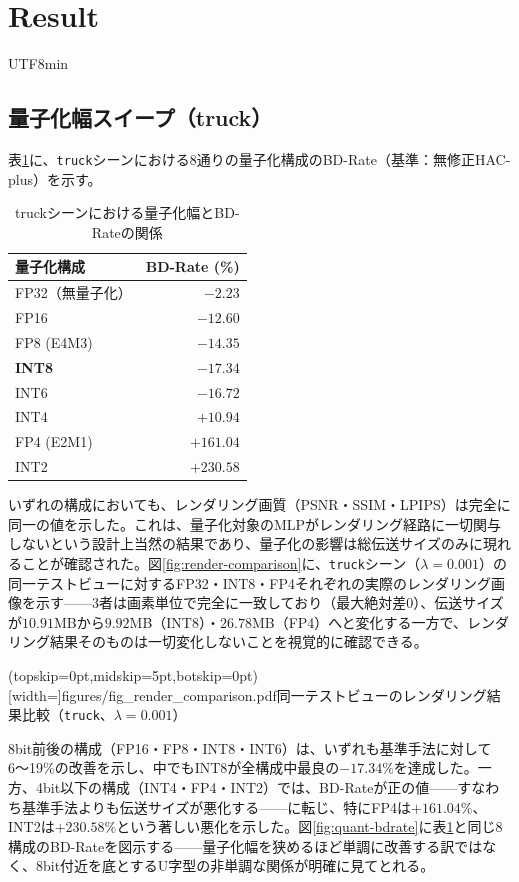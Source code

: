 \documentclass{ieeeaccess}
\begin{document}
\section{Result}
\begin{CJK}{UTF8}{min}

\subsection{量子化幅スイープ（truck）}
表\ref{tab:quant-sweep}に、\texttt{truck}シーンにおける8通りの量子化構成のBD-Rate（基準：無修正HAC-plus）を示す。

\begin{table}[!t]
\renewcommand{\arraystretch}{1.2}
\caption{truckシーンにおける量子化幅とBD-Rateの関係}
\label{tab:quant-sweep}
\centering
\begin{tabular}{lr}
\toprule
量子化構成 & BD-Rate (\%) \\
\midrule
FP32（無量子化） & $-2.23$ \\
FP16 & $-12.60$ \\
FP8 (E4M3) & $-14.35$ \\
\textbf{INT8} & $\mathbf{-17.34}$ \\
INT6 & $-16.72$ \\
INT4 & $+10.94$ \\
FP4 (E2M1) & $+161.04$ \\
INT2 & $+230.58$ \\
\bottomrule
\end{tabular}
\end{table}

いずれの構成においても、レンダリング画質（PSNR・SSIM・LPIPS）は完全に同一の値を示した。これは、量子化対象のMLPがレンダリング経路に一切関与しないという設計上当然の結果であり、量子化の影響は総伝送サイズのみに現れることが確認された。図\ref{fig:render-comparison}に、\texttt{truck}シーン（$\lambda=0.001$）の同一テストビューに対するFP32・INT8・FP4それぞれの実際のレンダリング画像を示す——3者は画素単位で完全に一致しており（最大絶対差$0$）、伝送サイズが$10.91$MBから$9.92$MB（INT8）・$26.78$MB（FP4）へと変化する一方で、レンダリング結果そのものは一切変化しないことを視覚的に確認できる。

\Figure[t!](topskip=0pt,midskip=5pt,botskip=0pt)[width=\columnwidth]{figures/fig_render_comparison.pdf}{同一テストビューのレンダリング結果比較（\texttt{truck}、$\lambda=0.001$）\label{fig:render-comparison}}

8bit前後の構成（FP16・FP8・INT8・INT6）は、いずれも基準手法に対して6〜19\%の改善を示し、中でもINT8が全構成中最良の$-17.34\%$を達成した。一方、4bit以下の構成（INT4・FP4・INT2）では、BD-Rateが正の値——すなわち基準手法よりも伝送サイズが悪化する——に転じ、特にFP4は$+161.04\%$、INT2は$+230.58\%$という著しい悪化を示した。図\ref{fig:quant-bdrate}に表\ref{tab:quant-sweep}と同じ8構成のBD-Rateを図示する——量子化幅を狭めるほど単調に改善する訳ではなく、8bit付近を底とするU字型の非単調な関係が明確に見てとれる。


\end{CJK}
\end{document}
